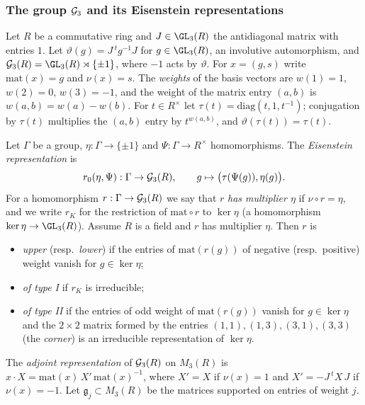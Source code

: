 \subsubsection{The group \texorpdfstring{$\mathcal G_3$}{G3} and its Eisenstein representations}

\begin{definition}\label{pf:eis:GG}
Let $R$ be a commutative ring and $J\in\GL_3(R)$ the antidiagonal matrix with entries $1$. Let
$\vartheta(g)=J\,{}^tg^{-1}J$ for $g\in\GL_3(R)$, an involutive automorphism, and
$\eisGG(R)=\GL_3(R)\rtimes\{\pm1\}$, where $-1$ acts by $\vartheta$. For $x=(g,s)$ write $\mathrm{mat}(x)=g$ and
$\nu(x)=s$. The \emph{weights} of the basis vectors are $w(1)=1$, $w(2)=0$, $w(3)=-1$, and the weight of the matrix
entry $(a,b)$ is $w(a,b)=w(a)-w(b)$. For $t\in R^\times$ let $\tau(t)=\mathrm{diag}(t,1,t^{-1})$; conjugation by $\tau(t)$
multiplies the $(a,b)$ entry by $t^{w(a,b)}$, and $\vartheta(\tau(t))=\tau(t)$.

Let $\Gamma$ be a group, $\eta:\Gamma\to\{\pm1\}$ and $\Psi:\Gamma\to R^\times$ homomorphisms. The \emph{Eisenstein
representation} is
\[
 r_0(\eta,\Psi):\Gamma\to\mathcal G_3(R),\qquad g\mapsto\bigl(\tau(\Psi(g)),\eta(g)\bigr).
\]
For a homomorphism $r:\Gamma\to\mathcal G_3(R)$ we say that $r$ \emph{has multiplier $\eta$} if $\nu\circ r=\eta$, and we write
$r_K$ for the restriction of $\mathrm{mat}\circ r$ to $\ker\eta$ (a homomorphism $\ker\eta\to\GL_3(R)$). Assume $R$ is a field and
$r$ has multiplier $\eta$. Then $r$ is
\begin{itemize}
\item \emph{upper} (resp.\ \emph{lower}) if the entries of $\mathrm{mat}(r(g))$ of negative (resp.\ positive) weight vanish for
  $g\in\ker\eta$;
\item \emph{of type I} if $r_K$ is irreducible;
\item \emph{of type II} if the entries of odd weight of $\mathrm{mat}(r(g))$ vanish for $g\in\ker\eta$ and the $2\times2$ matrix
  formed by the entries $(1,1),(1,3),(3,1),(3,3)$ (the \emph{corner}) is an irreducible representation of $\ker\eta$.
\end{itemize}
The \emph{adjoint representation} of $\mathcal G_3(R)$ on $M_3(R)$ is $x\cdot X=\mathrm{mat}(x)\,X'\,\mathrm{mat}(x)^{-1}$, where $X'=X$ if
$\nu(x)=1$ and $X'=-J\,{}^tX\,J$ if $\nu(x)=-1$. Let $\mathfrak g_j\subset M_3(R)$ be the matrices supported on entries of
weight $j$.
\end{definition}

